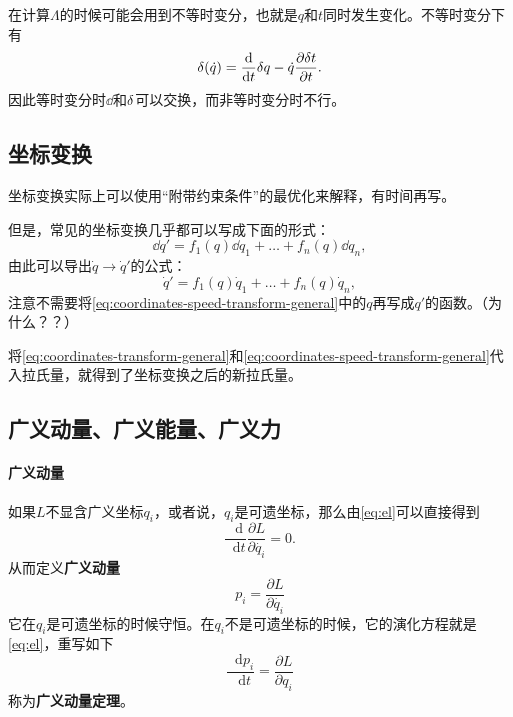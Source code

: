 \documentclass[UTF8, a4paper]{ctexart}
\newcommand*{\diff}{\mathop{}\!\mathrm{d}}
\newcommand*{\st}{\quad \text{s.t.} \quad}
\begin{document}
在计算$\Lambda$的时候可能会用到不等时变分，也就是$q$和$t$同时发生变化。不等时变分下有
\begin{equation}
    \var (\dot{q}) = \frac{\diff}{\diff t} \var q - \dot{q} \frac{\partial \var t}{\partial t}.
    \label{eq:non-contemporaneous-variation}
\end{equation}
因此等时变分时$\dd$和$\var$可以交换，而非等时变分时不行。

\subsection{坐标变换}

坐标变换实际上可以使用“附带约束条件”的最优化来解释，有时间再写。

但是，常见的坐标变换几乎都可以写成下面的形式：
\begin{equation}
    \dd{q'} = f_1(q) \dd{q_1} + \ldots + f_n(q) \dd{q_n},
    \label{eq:coordinates-transform-general}
\end{equation}
由此可以导出$\dot{q} \longrightarrow \dot{q}'$的公式：
\begin{equation}
    \dot{q}' = f_1(q) \dot{q}_1 + \ldots + f_n(q) \dot{q}_n,
    \label{eq:coordinates-speed-transform-general}
\end{equation}
注意不需要将\eqref{eq:coordinates-speed-transform-general}中的$q$再写成$q'$的函数。（为什么？？）

将\eqref{eq:coordinates-transform-general}和\eqref{eq:coordinates-speed-transform-general}代入拉氏量，就得到了坐标变换之后的新拉氏量。


\subsection{广义动量、广义能量、广义力}

\paragraph{广义动量} 如果$L$不显含广义坐标$q_i$，或者说，$q_i$是可遗坐标，那么由\eqref{eq:el}可以直接得到
\[
    \frac{\diff}{\diff t} \frac{\partial L}{\partial \dot{q_i}} = 0.
\]
从而定义\textbf{广义动量}
\begin{equation}
    p_i = \frac{\partial L}{\partial \dot{q_i}}
    \label{eq:generalized-momentum}
\end{equation}
它在$q_i$是可遗坐标的时候守恒。在$q_i$不是可遗坐标的时候，它的演化方程就是\eqref{eq:el}，重写如下
\begin{equation}
    \frac{\diff p_i}{\diff t} = \frac{\partial L}{\partial q_i}
    \label{eq:generalized-momentum-evolution}
\end{equation}
称为\textbf{广义动量定理}。
\end{document}
